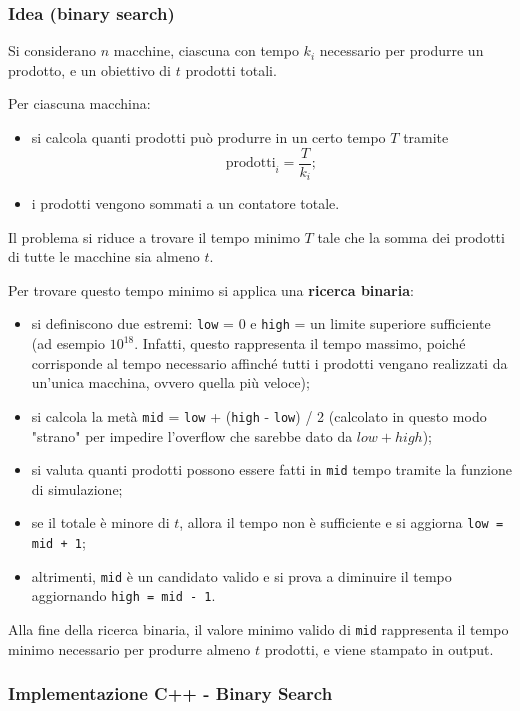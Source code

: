 \subsubsection*{Idea (binary search)}

Si considerano $n$ macchine, ciascuna con tempo $k_i$ necessario per produrre un prodotto, e un obiettivo di $t$ prodotti totali.

Per ciascuna macchina:
\begin{itemize}
	\item si calcola quanti prodotti può produrre in un certo tempo $T$ tramite
	\[
	\text{prodotti}_i = \frac{T}{k_i};
	\]
	\item i prodotti vengono sommati a un contatore totale.
\end{itemize}

Il problema si riduce a trovare il tempo minimo $T$ tale che la somma dei prodotti di tutte le macchine sia almeno $t$.

Per trovare questo tempo minimo si applica una \textbf{ricerca binaria}:
\begin{itemize}
	\item si definiscono due estremi: \texttt{low} = 0 e \texttt{high} = un limite superiore sufficiente (ad esempio $10^{18}$. Infatti, questo rappresenta il tempo massimo, poiché corrisponde al tempo necessario affinché tutti i prodotti vengano realizzati da un’unica macchina, ovvero quella più veloce);
	\item si calcola la metà \texttt{mid} = \texttt{low} + (\texttt{high} - \texttt{low}) / 2 (calcolato in questo modo "strano" per impedire l'overflow che sarebbe dato da $low + high$);
	\item si valuta quanti prodotti possono essere fatti in \texttt{mid} tempo tramite la funzione di simulazione;
	\item se il totale è minore di $t$, allora il tempo non è sufficiente e si aggiorna \texttt{low = mid + 1};
	\item altrimenti, \texttt{mid} è un candidato valido e si prova a diminuire il tempo aggiornando \texttt{high = mid - 1}.
\end{itemize}

Alla fine della ricerca binaria, il valore minimo valido di \texttt{mid} rappresenta il tempo minimo necessario per produrre almeno $t$ prodotti, e viene stampato in output.


\subsubsection*{Implementazione C++ - Binary Search}


